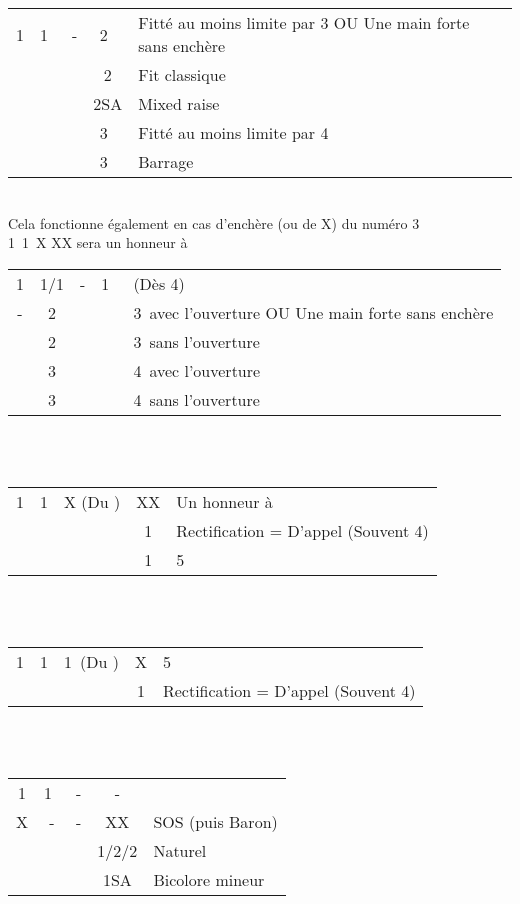 \documentclass[a4paper, oneside, 11pt]{report}
\begin{document}
	\begin{tabular}{cccc|l}
	1\carreau & 1\coeur\  & - & 2\carreau\ & Fitté au moins limite par 3 OU Une main forte sans enchère\\
	&&& 2\coeur & Fit classique\\
	&&& 2SA & Mixed raise\\
	&&& 3\carreau\ & Fitté au moins limite par 4\\
	&&& 3\coeur\ & Barrage\\
	\end{tabular}\\
	Cela fonctionne également en cas d'enchère (ou de X) du numéro 3\\
	1\carreau\ 1\coeur\ X XX sera un honneur à \coeur\\

	\begin{tabular}{cccc|l}
	1\trefle & 1\carreau/1\coeur  & - & 1\pique\ & (Dès 4\pique)\\
	- & 2\trefle &&& 3\pique\ avec l'ouverture OU Une main forte sans enchère\\
	& 2\pique &&& 3\pique\ sans l'ouverture\\
	& 3\trefle &&& 4\pique\ avec l'ouverture\\
	& 3\pique &&& 4\pique\ sans l'ouverture\\
	\end{tabular}\\\\

	\begin{tabular}{cccc|l}
	1\trefle & 1\carreau & X (Du \coeur) & XX & Un honneur à \carreau\\
	&&& 1\coeur & Rectification = D'appel (Souvent 4\pique)\\
	&&& 1\pique & 5\pique\\
	\end{tabular}\\\\

	\begin{tabular}{cccc|l}
	1\trefle & 1\carreau & 1\coeur\ (Du \pique) & X & 5\coeur\\
	&&& 1\pique & Rectification = D'appel (Souvent 4\coeur)\\
	\end{tabular}\\\\

	\begin{tabular}{cccc|l}
	1\trefle & 1\coeur\  & - & - &\\
	X & - & - & XX & SOS (puis Baron)\\
	&&& 1\pique/2\trefle/2\carreau & Naturel\\
	&&& 1SA & Bicolore mineur\\
	\end{tabular}\\\\
\end{document}
